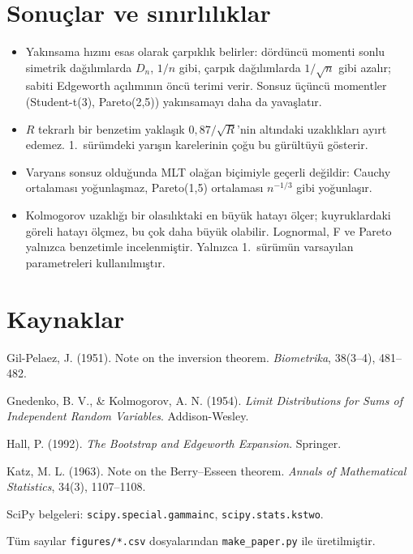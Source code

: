 \documentclass[11pt,a4paper]{article}
\begin{document}
\section{Sonuçlar ve sınırlılıklar}

\begin{itemize}
  \item Yakınsama hızını esas olarak çarpıklık belirler: dördüncü momenti sonlu simetrik dağılımlarda $D_n$, $1/n$ gibi, çarpık
  dağılımlarda $1/\sqrt n$ gibi azalır; sabiti Edgeworth açılımının öncü terimi verir. Sonsuz üçüncü momentler (Student-t(3),
  Pareto(2,5)) yakınsamayı daha da yavaşlatır.
  \item $R$ tekrarlı bir benzetim yaklaşık $0{,}87/\sqrt R$'nin altındaki uzaklıkları ayırt edemez. 1.\ sürümdeki yarışın karelerinin
  çoğu bu gürültüyü gösterir.
  \item Varyans sonsuz olduğunda MLT olağan biçimiyle geçerli değildir: Cauchy ortalaması yoğunlaşmaz, Pareto(1,5) ortalaması
  $n^{-1/3}$ gibi yoğunlaşır.
  \item Kolmogorov uzaklığı bir olasılıktaki en büyük hatayı ölçer; kuyruklardaki göreli hatayı ölçmez, bu çok daha büyük olabilir.
  Lognormal, F ve Pareto yalnızca benzetimle incelenmiştir. Yalnızca 1.\ sürümün varsayılan parametreleri kullanılmıştır.
\end{itemize}

\section*{Kaynaklar}
{\small
\setlength{\parskip}{2pt}
\hangindent=1.27cm Gil-Pelaez, J. (1951). Note on the inversion theorem. \textit{Biometrika}, 38(3--4), 481--482.\par
\hangindent=1.27cm Gnedenko, B. V., \& Kolmogorov, A. N. (1954). \textit{Limit Distributions for Sums of Independent Random Variables}. Addison-Wesley.\par
\hangindent=1.27cm Hall, P. (1992). \textit{The Bootstrap and Edgeworth Expansion}. Springer.\par
\hangindent=1.27cm Katz, M. L. (1963). Note on the Berry--Esseen theorem. \textit{Annals of Mathematical Statistics}, 34(3), 1107--1108.\par
\hangindent=1.27cm SciPy belgeleri: \texttt{scipy.special.gammainc}, \texttt{scipy.stats.kstwo}.\par

\smallskip
Tüm sayılar
\texttt{figures/*.csv} dosyalarından \texttt{make\_paper.py} ile üretilmiştir.
}
\end{document}
